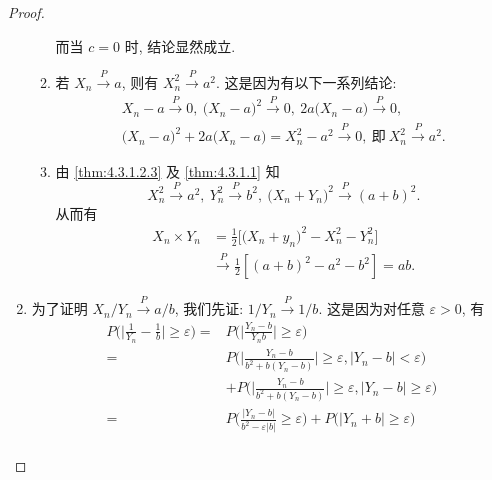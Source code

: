 \begin{proof}
\begin{enumerate}
\begin{enumerate}
            而当 $ c = 0$ 时, 结论显然成立.
            \item\label{thm:4.3.1.2.3} 若 $ X_n \stackrel{P}{\to} a $, 则有 $ X_n^2 \stackrel{P}{\to} a^2 $.
            这是因为有以下一系列结论:
            \begin{gather*}
                X_n - a \stackrel{P}{\to} 0, \ \bigl( X_n - a \bigr)^2 \stackrel{P}{\to} 0, \ 2a \bigl( X_n - a \bigr) \stackrel{P}{\to} 0,\\
                \bigl( X_n - a \bigr)^2 + 2a \bigl( X_n - a \bigr) = X_n^2 - a^2 \stackrel{P}{\to} 0, \ \text{即} \ X_n^2 \stackrel{P}{\to} a^2.
            \end{gather*}
            \item 由 \ref{thm:4.3.1.2.3} 及 \ref{thm:4.3.1.1} 知
            \begin{equation*}
                X_n^2 \stackrel{P}{\to} a^2, \ Y_n^2 \stackrel{P}{\to} b^2, \ \bigl( X_n + Y_n \bigr)^2 \stackrel{P}{\to} ( a + b )^2.
            \end{equation*}
            从而有
            \begin{align*}
                X_n \times Y_n & = \frac{1}{2} \bigl[ \bigl( X_n + y_n \bigr)^2 - X_n^2 - Y_n^2 \bigr]\\
                & \stackrel{P}{\to} \frac{1}{2} [ ( a + b )^2 - a^2 - b^2 ] = ab.
            \end{align*}
        \end{enumerate}
        \item 为了证明 $ X_n / Y_n \stackrel{P}{\to} a/b $, 我们先证: $ 1 / Y_n \stackrel{P}{\to} 1 / b $.
        这是因为对任意 $ \varepsilon > 0 $, 有
        \begin{align*}
            P \biggl( \biggl\lvert \frac{1}{Y_n} - \frac{1}{b} \biggr\rvert \geq \varepsilon \biggr)
            ={} & P \biggl( \biggl\lvert \frac{Y_n - b}{Y_n b} \biggr\rvert \geq \varepsilon \biggr)\\
            ={} & P \biggl( \biggl\lvert \frac{Y_n - b}{b^2 + b ( Y_n - b )} \biggr\rvert \geq \varepsilon, \bigl\lvert Y_n - b \bigr\rvert < \varepsilon \biggr)\\
            & + P \biggl( \biggl\lvert \frac{Y_n - b}{b^2 + b ( Y_n - b )} \biggr\rvert \geq \varepsilon, \bigl\lvert Y_n - b \bigr\rvert \geq \varepsilon \biggr)\\
            ={} & P \biggl( \frac{\lvert Y_n - b \rvert}{b^2 - \varepsilon \lvert b \rvert} \geq \varepsilon \biggr)
            + P \bigl( \bigl\lvert Y_n + b \bigr\rvert \geq \varepsilon \bigr)\\

\end{align*}
\end{enumerate}
\end{proof}
